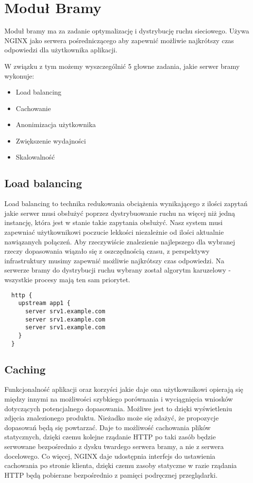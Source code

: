 \chapter {Moduł Bramy}

Moduł bramy ma za zadanie optymalizację i dystrybucję ruchu sieciowego.
Używa NGINX jako serwera pośredniczącego aby zapewnić możliwie najkrótszy czas
odpowiedzi dla użytkownika aplikacji.

W związku z tym możemy wyszczególnić 5 głowne zadania, jakie serwer bramy wykonuje:


\begin{itemize}
  \item Load balancing
  \item Cachowanie
  \item Anonimizacja użytkownika
  \item Zwiększenie wydajności
  \item Skalowalność
\end{itemize}\cite{nginxdoc86:online}

\section{Load balancing}

Load balancing to technika redukowania obciążenia wynikającego z ilości zapytań jakie serwer musi obsłużyć poprzez dystrybuowanie ruchu na więcej niż jedną instancję, która jest w stanie takie zapytania obsłużyć. Nasz system musi zapewniać użytkownikowi poczucie lekkości niezależnie od ilości aktualnie nawiązanych połączeń. Aby rzeczywiście znalezienie najlepszego dla wybranej rzeczy dopasowania wiązało się z oszczędnością czasu, z perspektywy infrastruktury musimy zapewnić możliwie najkrótszy czas odpowiedzi.
Na serwerze bramy do dystrybucji ruchu wybrany został algorytm karuzelowy - wszystkie procesy mają ten sam priorytet.
\begin{lstlisting}
  http {
    upstream app1 {
      server srv1.example.com
      server srv1.example.com
      server srv1.example.com
    }
  }
\end{lstlisting}

\section{Caching}

Funkcjonalność aplikacji oraz korzyści jakie daje ona użytkownikowi opierają się między innymi na możliwości szybkiego porównania i wyciągnięcia wniosków dotyczących potencjalnego dopasowania. Możliwe jest to dzięki wyświetleniu zdjęcia znalezionego produktu. Nieżadko może się zdażyć, że propozycje dopasowań będą się powtarzać. Daje to możliwość cachowania plików statycznych, dzięki czemu kolejne rządanie HTTP po taki zasób będzie serwowane bezpośrednio z dysku twardego serwera bramy, a nie z serwera docelowego.
Co więcej, NGINX daje udostępnia interfejs do ustawienia cachowania po stronie klienta, dzięki czemu zasoby statyczne w razie rządania HTTP będą pobierane bezpośrednio z pamięci podręcznej przeglądarki.

